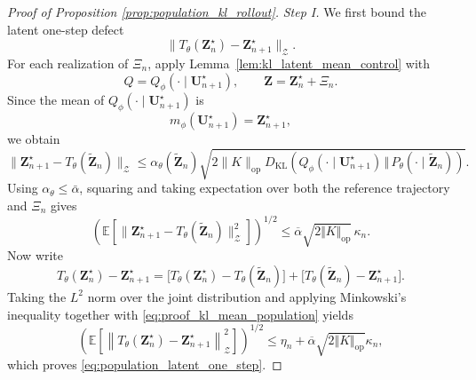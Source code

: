 \documentclass[11pt]{article}
\newcommand{\ol}{\overline}
\begin{document}
\begin{proof}[Proof of Proposition \ref{prop:population_kl_rollout}]
\textit{Step I.} We first bound the latent one-step defect
\[
    \|T_\theta(\mathbf Z_n^\star)-\mathbf Z_{n+1}^\star\|_{\mathcal Z}.
\]
For each realization of $\Xi_n$, apply Lemma~\ref{lem:kl_latent_mean_control} with
\[
    Q=Q_\phi(\cdot\mid \mathbf U_{n+1}^\star),
    \qquad
    \mathbf{Z}=\mathbf Z_n^\star+\Xi_n.
\]
Since the mean of $Q_\phi(\cdot\mid \mathbf U_{n+1}^\star)$ is
\[
    m_\phi(\mathbf U_{n+1}^\star)=\mathbf Z_{n+1}^\star,
\]
we obtain
\begin{equation}
\bigl\|\mathbf Z_{n+1}^\star
    -T_\theta(\widetilde{\mathbf Z}_n)
\bigr\|_{\mathcal Z}\leq
\alpha_\theta(\widetilde{\mathbf Z}_n)
\sqrt{
        2\|K\|_{\mathrm{op}}
        D_{\mathrm{KL}}
        \left(
            Q_\phi(\cdot\mid\mathbf U_{n+1}^\star)
            \,\Vert\,
            P_\theta(\cdot\mid\widetilde{\mathbf Z}_n)
        \right)
    }.
    \label{eq:proof_mean_control}
\end{equation}
Using $\alpha_\theta\leq\bar\alpha$, squaring and taking expectation over both the reference trajectory and $\Xi_n$ gives
\begin{equation}
\left(\mathbb E\left[\bigl\|
\mathbf Z_{n+1}^\star-T_\theta(\widetilde{\mathbf Z}_n)
\bigr\|_{\mathcal Z}^2\right]\right)^{1/2}
\leq\ol{\alpha}\sqrt{2\Vert K\Vert_\mathrm{op}}\,\kappa_n.
\label{eq:proof_kl_mean_population}
\end{equation}
Now write
\[
    T_\theta(\mathbf Z_n^\star)-\mathbf Z_{n+1}^\star
    =
    \bigl[
        T_\theta(\mathbf Z_n^\star)
        -
        T_\theta(\widetilde{\mathbf Z}_n)
    \bigr]
    +
    \bigl[
        T_\theta(\widetilde{\mathbf Z}_n)
        -
        \mathbf Z_{n+1}^\star
    \bigr].
\]
Taking the $L^2$ norm over the joint distribution and applying Minkowski's inequality together with \eqref{eq:proof_kl_mean_population} yields
\[
    \left(
        \mathbb E
        \left[
            \left\|
                T_\theta(\mathbf Z_n^\star)
                -
                \mathbf Z_{n+1}^\star
            \right\|_{\mathcal Z}^2
        \right]
    \right)^{1/2}
    \leq
    \eta_n+\ol{\alpha}\sqrt{2\Vert K\Vert_\mathrm{op}}\kappa_n,
\]
which proves \eqref{eq:population_latent_one_step}.


\end{proof}
\end{document}
